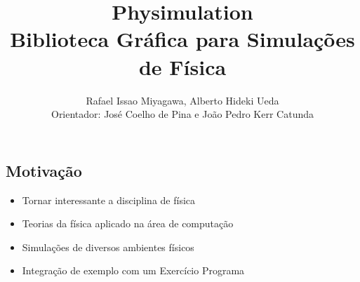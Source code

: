 \documentclass[plainboxedsections]{sciposter}
\title{Physimulation \\ Biblioteca Gráfica para Simulações de Física}
\author{Rafael Issao Miyagawa, Alberto Hideki Ueda\\ Orientador: José Coelho de Pina e João Pedro Kerr Catunda}
\institute{Instituto de Matemática e Estatística - Universidade de São Paulo}
\begin{document}
\maketitle

\renewcommand{\papertype}{b1}
\renewcommand{\sectionsize}{\Huge}

\begin{multicols}{2}

  \section*{Motivação}
  \fontsize{50pt}{15pt}\selectfont
  \begin{itemize}
    \item Tornar interessante a disciplina de física
    \item Teorias da física aplicado na área de computação
    \item Simulações de diversos ambientes físicos
    \item Integração de exemplo com um Exercício Programa
  \end{itemize}


\end{multicols}
\end{document}
